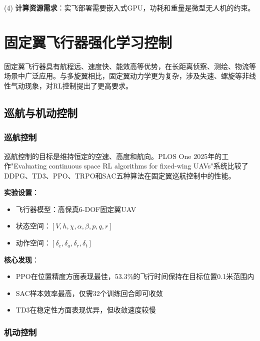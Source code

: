 \documentclass[12pt,a4paper]{ctexart}
\begin{document}
(4) \textbf{计算资源需求}：实飞部署需要嵌入式GPU，功耗和重量是微型无人机的约束。

\section{固定翼飞行器强化学习控制}\label{sec:fixedwing}

固定翼飞行器具有航程远、速度快、能效高等优势，在长距离侦察、测绘、物流等场景中广泛应用。与多旋翼相比，固定翼动力学更为复杂，涉及失速、螺旋等非线性气动现象，对RL控制提出了更高要求。

\subsection{巡航与机动控制}

\subsubsection{巡航控制}

巡航控制的目标是维持恒定的空速、高度和航向。PLOS One 2025年的工作"Evaluating continuous space RL algorithms for fixed-wing UAVs"系统比较了DDPG、TD3、PPO、TRPO和SAC五种算法在固定翼巡航控制中的性能。

\textbf{实验设置}：
\begin{itemize}
    \item 飞行器模型：高保真6-DOF固定翼UAV
    \item 状态空间：$[V, h, \chi, \alpha, \beta, p, q, r]$ 
    \item 动作空间：$[\delta_e, \delta_a, \delta_r, \delta_t]$
\end{itemize}

\textbf{核心发现}：
\begin{itemize}
    \item PPO在位置精度方面表现最佳，53.3\%的飞行时间保持在目标位置0.1米范围内
    \item SAC样本效率最高，仅需32个训练回合即可收敛
    \item TD3在稳定性方面表现优异，但收敛速度较慢
\end{itemize}

\subsubsection{机动控制}
\end{document}
